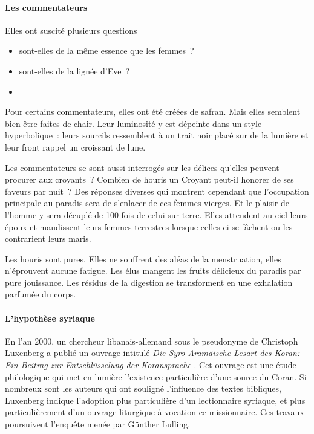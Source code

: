 \paragraph{Les commentateurs}

Elles ont suscité plusieurs questions

\begin{itemize}
\item
  sont-elles de la même essence que les femmes~?
\item
  sont-elles de la lignée d'Eve~?
\item
\end{itemize}

Pour certains commentateurs, elles ont été créées de safran. Mais elles
semblent bien être faites de chair. Leur luminosité y est dépeinte dans
un style hyperbolique~: leurs sourcils ressemblent à un trait noir placé
sur de la lumière et leur front rappel un croissant de lune.

Les commentateurs se sont aussi interrogés sur les délices qu'elles
peuvent procurer aux croyants~? Combien de houris un Croyant peut-il
honorer de ses faveurs par nuit~? Des réponses diverses qui montrent
cependant que l'occupation principale au paradis sera de s'enlacer de ces
femmes vierges. Et le plaisir de l'homme y sera décuplé de 100 fois de
celui sur terre. Elles attendent au ciel leurs époux et maudissent leurs
femmes terrestres lorsque celles-ci se fâchent ou les contrarient leurs
maris.

Les houris sont pures. Elles ne souffrent des aléas de la menstruation,
elles n'éprouvent aucune fatigue. Les élus mangent les fruits délicieux
du paradis par pure jouissance. Les résidus de la digestion se
transforment en une exhalation parfumée du corps.

\paragraph{L'hypothèse syriaque}

En l'an 2000, un chercheur libanais-allemand sous le pseudonyme de
Christoph Luxenberg a publié un ouvrage intitulé \emph{Die
Syro-Aramäische Lesart des Koran:~ Ein Beitrag zur Entschlüsselung der
Koransprache} . Cet ouvrage est une
étude philologique qui met en lumière l'existence particulière d'une
source du Coran. Si nombreux sont les auteurs qui ont souligné
l'influence des textes bibliques, Luxenberg indique l'adoption plus
particulière d'un lectionnaire syriaque, et plus particulièrement d'un
ouvrage liturgique à vocation ce missionnaire. Ces travaux poursuivent
l'enquête menée par Günther Lulling.


